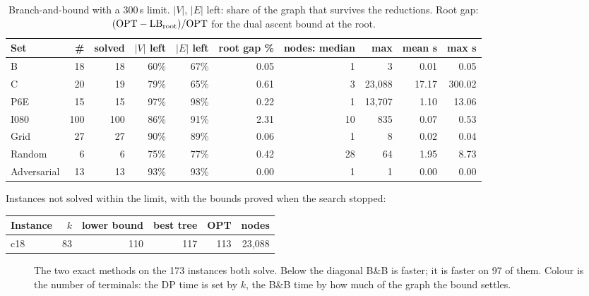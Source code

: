 \begin{table}[!htbp]\centering\small\setlength{\tabcolsep}{4pt}
\begin{tabular}{@{}lrrrrrrrrr@{}}\toprule
Set & \# & solved & \(|V|\) left & \(|E|\) left & root gap \% & nodes: median & max & mean s & max s\\\midrule
B & 18 & 18 & 60\% & 67\% & 0.05 & 1 & 3 & 0.01 & 0.05\\
C & 20 & 19 & 79\% & 65\% & 0.61 & 3 & 23{,}088 & 17.17 & 300.02\\
P6E & 15 & 15 & 97\% & 98\% & 0.22 & 1 & 13{,}707 & 1.10 & 13.06\\
I080 & 100 & 100 & 86\% & 91\% & 2.31 & 10 & 835 & 0.07 & 0.53\\
Grid & 27 & 27 & 90\% & 89\% & 0.06 & 1 & 8 & 0.02 & 0.04\\
Random & 6 & 6 & 75\% & 77\% & 0.42 & 28 & 64 & 1.95 & 8.73\\
Adversarial & 13 & 13 & 93\% & 93\% & 0.00 & 1 & 1 & 0.00 & 0.00\\
\bottomrule\end{tabular}
\caption{Branch-and-bound with a 300\,s limit. \(|V|\), \(|E|\) left: share of the graph that survives the reductions. Root gap: \((\mathrm{OPT}-\mathrm{LB}_{\text{root}})/\mathrm{OPT}\) for the dual ascent bound at the root.}\label{tab:bnb}
\end{table}
\noindent Instances not solved within the limit, with the bounds proved when the search stopped:
\begin{center}\small\begin{tabular}{@{}lrrrrr@{}}\toprule
Instance & \(k\) & lower bound & best tree & OPT & nodes\\\midrule
c18 & 83 & 110 & 117 & 113 & 23{,}088\\
\bottomrule\end{tabular}\end{center}
\begin{figure}[!htbp]\centering
{}
\caption{The two exact methods on the 173 instances both solve. Below the diagonal B\&B is faster; it is faster on 97 of them.
Colour is the number of terminals: the DP time is set by \(k\), the B\&B time by how much of the graph the bound settles.}\label{fig:dpbb}
\end{figure}
